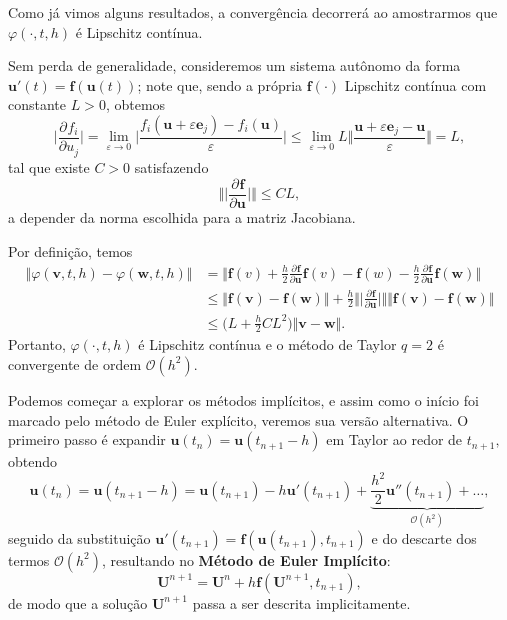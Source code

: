 \documentclass[../differential_methods.tex]{subfiles}
\begin{document}
\begin{example}[Convergência do Método de Taylor \(q=2\)]
	Como já vimos alguns resultados, a convergência decorrerá ao amostrarmos que \(\varphi (\cdot , t, h)\) é Lipschitz contínua.

	Sem perda de generalidade, consideremos um sistema autônomo da forma \(\mathbf{u}'(t)=\mathbf{f}(\mathbf{u}(t))\); note que, sendo a própria \(\mathbf{f}(\cdot )\) Lipschitz contínua com constante \(L>0\), obtemos
	\[
		\biggl\vert \frac{\partial^{}f_{i}}{\partial u_{j}^{}} \biggr\vert = \lim_{\varepsilon \to 0}\biggl\vert \frac{f_{i}(\mathbf{u}+\varepsilon \mathbf{e}_{j})-f_{i}(\mathbf{u})}{\varepsilon } \biggr\vert\leq \lim_{\varepsilon \to 0} L \biggl\Vert \frac{\mathbf{u}+\varepsilon \mathbf{e}_{j}-\mathbf{u}}{\varepsilon } \biggr\Vert = L,
	\]
	tal que existe \(C > 0\) satisfazendo
	\[
		\biggl\Vert \biggl\vert \frac{\partial^{}\mathbf{f}}{\partial \mathbf{u}^{}} \biggr\vert \biggr\Vert \leq C L,
	\]
	a depender da norma escolhida para a matriz Jacobiana.

	Por definição, temos
	\begin{align*}
		\Vert \varphi (\mathbf{v}, t, h)-\varphi (\mathbf{w}, t, h) \Vert & = \biggl\Vert \mathbf{f}(v)+ \frac{h}{2}\frac{\partial^{}\mathbf{f}}{\partial \mathbf{u}^{}} \mathbf{f}(v)-\mathbf{f}(w)- \frac{h}{2}\frac{\partial^{}\mathbf{f}}{\partial \mathbf{u}^{}}\mathbf{f}(\mathbf{w}) \biggr\Vert                \\
		                                                                  & \leq \Vert \mathbf{f}(\mathbf{v})-\mathbf{f}(\mathbf{w}) \Vert + \frac{h}{2}\biggl\Vert \biggl\vert \frac{\partial^{}\mathbf{f}}{\partial \mathbf{u}^{}} \biggr\vert \biggr\Vert \Vert \mathbf{f}(\mathbf{v})-\mathbf{f}(\mathbf{w}) \Vert \\
		                                                                  & \leq \biggl(L+\frac{h}{2}CL^{2}\biggr)\Vert \mathbf{v} -\mathbf{w}\Vert.
	\end{align*}
	Portanto, \(\varphi (\cdot , t, h)\) é Lipschitz contínua e o método de Taylor \(q=2\) é convergente de ordem \(\mathcal{O}(h^{2})\).
\end{example}

Podemos começar a explorar os métodos implícitos, e assim como o início foi marcado pelo método de Euler explícito, veremos sua versão alternativa. O primeiro passo é expandir \(\mathbf{u}(t_{n})=\mathbf{u}(t_{n+1}-h)\) em Taylor ao redor de \(t_{n+1},\) obtendo
\[
	\mathbf{u}(t_{n})=\mathbf{u}(t_{n+1}-h)=\mathbf{u}(t_{n+1})-h \mathbf{u}'(t_{n+1}) + \underbrace{\frac{h^{2}}{2}\mathbf{u}''(t_{n+1})+\dotsc }_{\mathcal{O}(h^{2})},
\]
seguido da substituição \(\mathbf{u}'(t_{n+1}) = \mathbf{f}(\mathbf{u}(t_{n+1}), t_{n+1})\) e do descarte dos termos \(\mathcal{O}(h^{2})\), resultando no \textbf{Método de Euler Implícito}:
\[
	\boxed{\mathbf{U}^{n+1}=\mathbf{U}^{n}+h \mathbf{f}(\mathbf{U}^{n+1}, t_{n+1})},
\]
de modo que a solução \(\mathbf{U}^{n+1}\) passa a ser descrita implicitamente.
\end{document}
